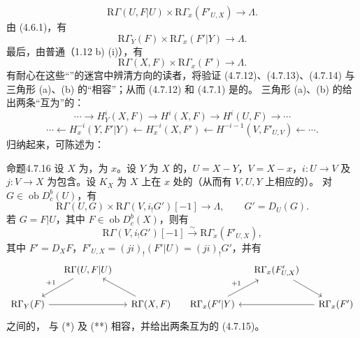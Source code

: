 \[
\mathrm R\Gamma(U,F|U)\times\mathrm R\Gamma_x(F'_{U,X})\longrightarrow\Lambda.\tag{4.7.12}
\]
由 (4.6.1)，有
\[
\mathrm R\Gamma_Y(F)\times\mathrm R\Gamma_x(F'|Y)\longrightarrow\Lambda.\tag{4.7.13}
\]
最后，由普通（1.12 b) (i)），有
\[
\mathrm R\Gamma(X,F)\times\mathrm R\Gamma_x(F')\longrightarrow\Lambda.\tag{4.7.14}
\]
有耐心在这些“”的迷宫中辨清方向的读者，将验证 (4.7.12)、(4.7.13)、(4.7.14) 与三角形 (a)、(b) 的“相容”；从而 (4.7.12) 和 (4.7.1) 是的。
三角形 (a)、(b) 的给出两条“互为”的：
\[
\cdots\longrightarrow H_Y^i(X,F)\longrightarrow H^i(X,F)\longrightarrow H^i(U,F)\longrightarrow\cdots
\tag{4.7.15}
\]
\[
\cdots\longleftarrow H_x^{-i}(Y,F'|Y)\longleftarrow H_x^{-i}(X,F')\longleftarrow H^{-i-1}(V,F'_{U,V})\longleftarrow\cdots.
\]
归纳起来，可陈述为：
\begin{SGAresult}{命题}{4.7.16}
设 $X$ 为，为 $x$。设 $Y$ 为 $X$ 的，$U=X-Y$，$V=X-x$，$i:U\to V$ 及 $j:V\to X$ 为包含。设 $K_X$ 为 $X$ 上在 $x$ 处的（从而有 $V,U,Y$ 上相应的）。
对 $G\in\operatorname{ob}D_c^b(U)$，有
\[
\mathrm R\Gamma(U,G)\times\mathrm R\Gamma(V,i_!G')[-1]\longrightarrow\Lambda,\qquad G'=D_U(G).\tag{*}
\]
若 $G=F|U$，其中 $F\in\operatorname{ob}D_c^b(X)$，则有
\[
\mathrm R\Gamma(V,i_!G')[-1]\xrightarrow\sim\mathrm R\Gamma_x(F'_{U,X}),\tag{**}
\]
其中 $F'=D_XF$，$F'_{U,X}=(ji)_!(F'|U)=(ji)_!G'$，并有
\[
\begin{tikzcd}[column sep=small]
&\mathrm R\Gamma(U,F|U)\arrow[dl,"{+1}"']&&&\mathrm R\Gamma_x(F'_{U,X})\arrow[dr]\\
\mathrm R\Gamma_Y(F)\arrow[rr]&&\mathrm R\Gamma(X,F)\arrow[ul]&\mathrm R\Gamma_x(F'|Y)\arrow[ur,"{+1}"]&&\mathrm R\Gamma_x(F')\arrow[ll]
\end{tikzcd}
\]
之间的，
与 (*) 及 (**) 相容，并给出两条互为的 (4.7.15)。
\end{SGAresult}
